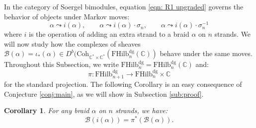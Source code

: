 \documentclass[12pt]{amsart}
\numberwithin{equation}{section}
\newtheorem{corollary}[theorem]{Corollary}
\theoremstyle{definition}
\theoremstyle{remark}
\DeclareMathOperator{\Tr}{Tr}
\newcommand{\CC}{\mathbb{C}}
\newcommand{\CB}{\mathcal{B}}
\newcommand{\CE}{\mathcal{E}}
\newcommand{\CO}{\mathcal{O}}
\newcommand{\CT}{\mathcal{T}}
\renewcommand{\1}{\mathbf{1}}
\newcommand{\coh}{\mathrm{Coh}}
\newcommand{\FH}{\mathrm{FHilb}}
\newcommand{\torus}{\CC^{*} \times \CC^*}
\newcommand{\dg}{\text{dg}}%
\begin{document}
In the category of Soergel bimodules, equation \eqref{eqn: R1 upgraded} governs the behavior of objects under Markov moves:
\begin{equation}
\label{eqn:markov}
\alpha \leadsto i(\alpha), \qquad \alpha \leadsto i(\alpha) \cdot \sigma_n, \qquad \alpha \leadsto i(\alpha) \cdot \sigma^{-1}_n
\end{equation}
where $i$ is the operation of adding an extra strand to a braid $\alpha$ on $n$ strands. We will now study how the complexes of sheaves $\CB(\alpha) = \iota_*(\alpha) \in D^b(\coh_{\torus}(\FH_n^\dg(\CC))$ behave under the same moves. Throughout this Subsection, we write $\FH_n^\dg = \FH_n^\dg(\CC)$ and:
$$
\pi:\FH_{n+1}^{\dg}  \rightarrow \FH_n^{\dg} \times \CC
$$
for the standard projection. The following Corollary is an easy consequence of Conjecture \ref{conj:main}, as we will show in Subsection \ref{sub:proof}.

\begin{corollary}
\label{cor:markov 1}
For any braid $\alpha$ on $n$ strands, we have: 
\begin{equation}
\label{eqn:markov 0}
\CB(i(\alpha)) = \pi^*(\CB(\alpha)) .
\end{equation}

\end{corollary}


\end{document}
